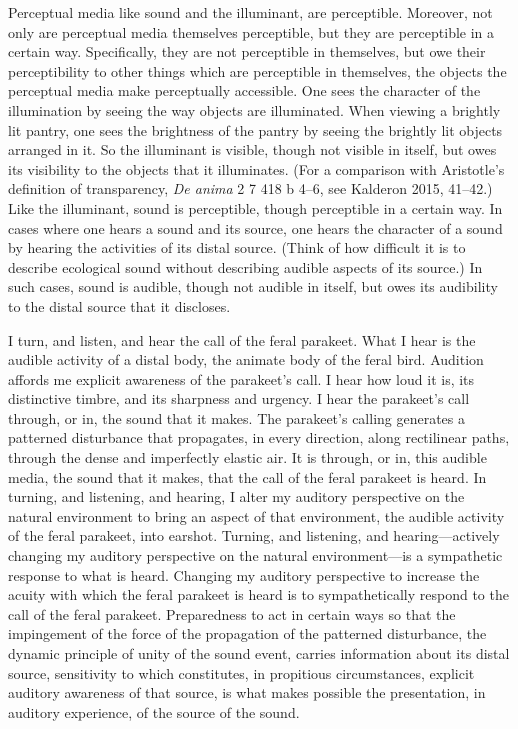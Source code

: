 \documentclass[12pt]{article}
\begin{document}

Perceptual media like sound and the illuminant, are perceptible. Moreover, not only are perceptual media themselves perceptible, but they are perceptible in a certain way. Specifically, they are not perceptible in themselves, but owe their perceptibility to other things which are perceptible in themselves, the objects the perceptual media make perceptually accessible. One sees the character of the illumination by seeing the way objects are illuminated. When viewing a brightly lit pantry, one sees the brightness of the pantry by seeing the brightly lit objects arranged in it. So the illuminant is visible, though not visible in itself, but owes its visibility to the objects that it illuminates. (For a comparison with Aristotle’s definition of transparency, \emph{De anima} 2 7 418 b 4–6, see Kalderon 2015, 41–42.) Like the illuminant, sound is perceptible, though perceptible in a certain way. In cases where one hears a sound and its source, one hears the character of a sound by hearing the activities of its distal source. (Think of how difficult it is to describe ecological sound without describing audible aspects of its source.) In such cases, sound is audible, though not audible in itself, but owes its audibility to the distal source that it discloses.

I turn, and listen, and hear the call of the feral parakeet. What I hear is the audible activity of a distal body, the animate body of the feral bird. Audition affords me explicit awareness of the parakeet’s call. I hear how loud it is, its distinctive timbre, and its sharpness and urgency. I hear the parakeet's call through, or in, the sound that it makes. The parakeet's calling generates a patterned disturbance that propagates, in every direction, along rectilinear paths, through the dense and imperfectly elastic air. It is through, or in, this audible media, the sound that it makes, that the call of the feral parakeet is heard. In turning, and listening, and hearing, I alter my auditory perspective on the natural environment to bring an aspect of that environment, the audible activity of the feral parakeet, into earshot. Turning, and listening, and hearing---actively changing my auditory perspective on the natural environment---is a sympathetic response to what is heard. Changing my auditory perspective to increase the acuity with which the feral parakeet is heard is to sympathetically respond to the call of the feral parakeet. Preparedness to act in certain ways so that the impingement of the force of the propagation of the patterned disturbance, the dynamic principle of unity of the sound event, carries information about its distal source, sensitivity to which constitutes, in propitious circumstances, explicit auditory awareness of that source, is what makes possible the presentation, in auditory experience, of the source of the sound. 
\end{document}
